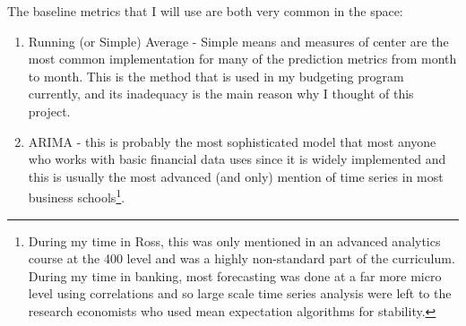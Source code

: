 \documentclass[11pt,a4paper]{article}
\begin{document}
The baseline metrics that I will use are both very common in the space:
\begin{enumerate}
	\item Running (or Simple) Average - Simple means and measures of center are the most common implementation for many of the prediction metrics from month to month. This is the method that is used in my budgeting program currently, and its inadequacy is the main reason why I thought of this project. 
	\item ARIMA - this is probably the most sophisticated model that most anyone who works with basic financial data uses since it is widely implemented and this is usually the most advanced (and only) mention of time series in most business schools\footnote{During my time in Ross, this was only mentioned in an advanced analytics course at the 400 level and was a highly non-standard part of the curriculum. During my time in banking, most forecasting was done at a far more micro level using correlations and so large scale time series analysis were left to the research economists who used mean expectation algorithms for stability.}. 
\end{enumerate}
\end{document}
